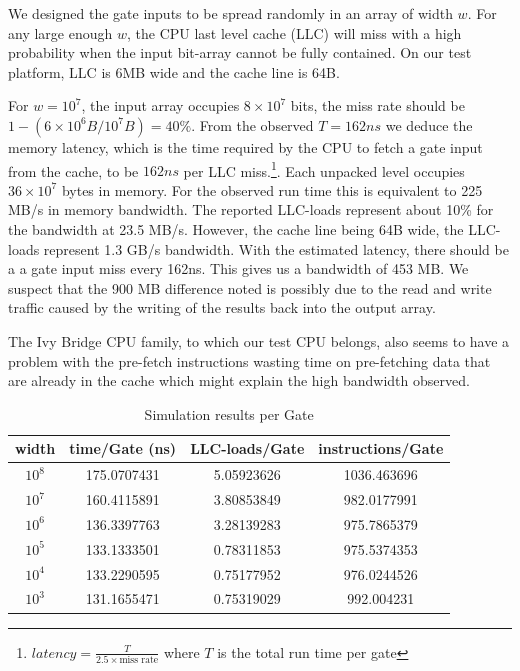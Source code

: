 We designed the gate inputs to be spread randomly in an array of width $w$. For any large enough $w$, the CPU last level cache (LLC) will miss with a high probability when the input bit-array cannot be fully contained. On our test platform, LLC is 6MB wide and the cache line is 64B\cite{agnor}. 
\par
For $w = 10^7$, the input array occupies $8 \times 10^7$ bits, the miss rate should be $1 - (6\times10^6B/10^7B) = 40\%$. From the observed $T = 162ns$ we deduce the memory latency, which is the time required by the CPU to fetch a gate input from the cache, to be $162ns$ per LLC miss.\footnote{ $latency = \frac{T}{2.5 \times \text{miss rate}}$ where $T$ is the total run time per gate}. Each unpacked level occupies $ 36\times10^7$ bytes in memory. For the observed run time this is equivalent to 225 MB/s in memory bandwidth. The reported LLC-loads represent about 10\% for the bandwidth at 23.5 MB/s. However, the cache line being 64B wide, the LLC-loads represent 1.3 GB/s bandwidth. With the estimated latency, there should be a a gate input miss every 162ns. This gives us a bandwidth of 453 MB. We suspect that the 900 MB difference noted is possibly due to the read and write traffic caused by the writing of the results back into the output array.
\par
The Ivy Bridge CPU family, to which our test CPU belongs, also seems to have a problem with the pre-fetch instructions wasting time on pre-fetching data that are already in the cache\cite{agnor} which might explain the high bandwidth observed.
\par
\begin{table}[]
\centering
\begin{tabular}{|c|c|c|c|}
\hline
width  & time/Gate (ns) & LLC-loads/Gate & instructions/Gate \\ \hline
$10^8$ & 175.0707431    & 5.05923626     & 1036.463696       \\ \hline
$10^7$ & 160.4115891    & 3.80853849     & 982.0177991       \\ \hline
$10^6$ & 136.3397763    & 3.28139283     & 975.7865379       \\ \hline
$10^5$ & 133.1333501    & 0.78311853     & 975.5374353       \\ \hline
$10^4$ & 133.2290595    & 0.75177952     & 976.0244526       \\ \hline
$10^3$ & 131.1655471    & 0.75319029     & 992.004231        \\ \hline
\end{tabular}
\caption{Simulation results per Gate}
\label{tab:fig3}
\end{table}
